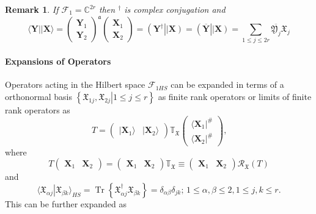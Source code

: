 \documentclass[aps, preprint]{revtex4}
\newtheorem{remark}[theorem]{Remark}
\begin{document}
\begin{remark}
If $\mathcal{F}_{1} =\mathbb{C}^{2 r}$ then $^{ \dag }$ is complex conjugation and
\begin{equation} \langle \mathbf{Y}\vert \vert \mathbf{X} \rangle  =\left (\begin{array}{c}\mathbf{Y}_{1} \\
\mathbf{Y}_{2}\end{array}\right )^{\mathfrak{a}} \left (\begin{array}{c}\mathbf{X}_{1} \\
\mathbf{X}_{2}\end{array}\right ) =\left (\mathbf{Y}^{ \dag }\right \vert \left \vert \mathbf{X}\right ) =\left (\overline{\mathbf{Y}}\right \vert \left \vert \mathbf{X}\right ) =\sum _{1 \leq j \leq 2 r}\overline{\mathfrak{Y}_{j}} \mathfrak{X}_{j}
\end{equation}
\end{remark}

\paragraph{Expansions of Operators}
Operators acting in the Hilbert space $\mathcal{F}_{1 H S}$ can be expanded in terms of a orthonormal basis $\left \{\left .\mathfrak{X}_{1 j} ,\mathfrak{X}_{2 j}\right \vert 1 \leq j \leq r\right \}$ as finite rank operators or limits of finite rank operators as
\begin{equation}T =\left (\begin{array}{cc}\vert \mathbf{X}_{1} \rangle  & \vert \mathbf{X}_{2} \rangle \end{array}\right ) \mathbb{T}_{\mathfrak{X}} \left (\begin{array}{c} \langle \mathbf{X}_{1}\vert ^{\#} \\
 \langle \mathbf{X}_{2}\vert ^{\#}\end{array}\right )\text{,}
\end{equation}where
\begin{equation}T \left (\begin{array}{cc}\mathbf{X}_{1} & \mathbf{X}_{2}\end{array}\right ) =\left (\begin{array}{cc}\mathbf{X}_{1} & \mathbf{X}_{2}\end{array}\right ) \mathbb{T}_{\mathfrak{X}} \equiv \left (\begin{array}{cc}\mathbf{X}_{1} & \mathbf{X}_{2}\end{array}\right ) \mathcal{R}_{\mathfrak{X}} \left (T\right )
\end{equation}and
\begin{equation} \langle \left .\mathfrak{X}_{\alpha  j}\right \vert \mathfrak{X}_{\beta  k} \rangle _{H S} =\ensuremath{\operatorname*{Tr}} \left \{\mathfrak{X}_{\alpha  j}^{ \dag } \mathfrak{X}_{\beta  k}\right \} =\delta _{\alpha  \beta } \delta _{j k} ;\,1 \leq \alpha  ,\beta  \leq 2 ,1 \leq j ,k \leq r\text{.}
\end{equation}This can be further expanded as
\begin{equation*}
\end{equation*}
\end{document}
